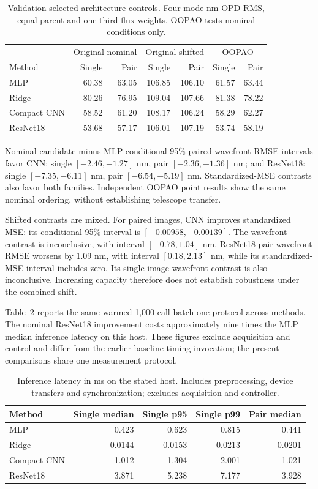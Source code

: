 \documentclass[11pt,a4paper]{article}
\begin{document}
\begin{table}[ht]
\centering\small
\caption{Validation-selected architecture controls. Four-mode nm OPD RMS,
equal parent and one-third flux weights. OOPAO tests nominal conditions only.}
\begin{tabular}{@{}lrrrrrr@{}}
\toprule
&\multicolumn{2}{c}{Original nominal}&\multicolumn{2}{c}{Original shifted}&\multicolumn{2}{c}{OOPAO}\\
Method&Single&Pair&Single&Pair&Single&Pair\\
\midrule
MLP&60.38&63.05&106.85&106.10&61.57&63.44\\
Ridge&80.26&76.95&109.04&107.66&81.38&78.22\\
Compact CNN&58.52&61.20&108.17&106.24&58.29&62.27\\
ResNet18&53.68&57.17&106.01&107.19&53.74&58.19\\
\bottomrule
\end{tabular}
\label{tab:architectures}
\end{table}

Nominal candidate-minus-MLP conditional 95\% paired wavefront-RMSE intervals
favor CNN: single $[-2.46,-1.27]$ nm, pair $[-2.36,-1.36]$ nm; and ResNet18:
single $[-7.35,-6.11]$ nm, pair $[-6.54,-5.19]$ nm. Standardized-MSE contrasts
also favor both families. Independent OOPAO point results show the same
nominal ordering, without establishing telescope transfer.

Shifted contrasts are mixed. For paired images, CNN improves standardized MSE:
its conditional 95\% interval is $[-0.00958,-0.00139]$. The wavefront contrast
is inconclusive, with interval $[-0.78,1.04]$ nm. ResNet18 pair wavefront RMSE
worsens by 1.09 nm, with interval $[0.18,2.13]$ nm, while its standardized-MSE
interval includes zero. Its single-image wavefront contrast is also
inconclusive. Increasing capacity therefore does not establish robustness
under the combined shift.

Table~\ref{tab:architecture-latency} reports the same warmed 1,000-call
batch-one protocol across methods. The nominal ResNet18 improvement
costs approximately nine times the MLP median inference latency on this host.
These figures exclude acquisition and control and differ from the earlier
baseline timing invocation; the present comparisons share one measurement protocol.

\begin{table}[ht]
\centering\small
\caption{Inference latency in ms on the stated host. Includes preprocessing,
device transfers and synchronization; excludes acquisition and controller.}
\begin{tabular}{@{}lrrrr@{}}
\toprule
Method&Single median&Single p95&Single p99&Pair median\\
\midrule
MLP&0.423&0.623&0.815&0.441\\
Ridge&0.0144&0.0153&0.0213&0.0201\\
Compact CNN&1.012&1.304&2.001&1.021\\
ResNet18&3.871&5.238&7.177&3.928\\
\bottomrule
\end{tabular}
\label{tab:architecture-latency}
\end{table}
\end{document}
